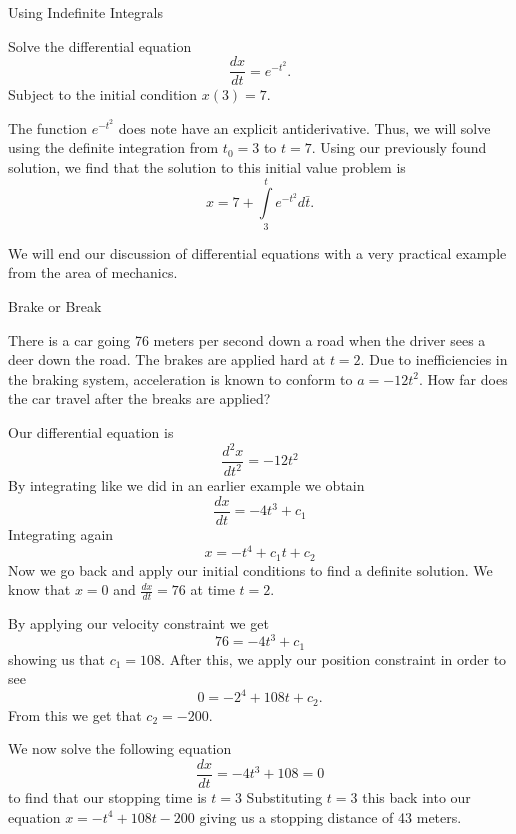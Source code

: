 \begin{example} Using Indefinite Integrals\newline

Solve the differential equation 
$$\frac{dx}{dt} = e^{-t^2}.$$
Subject to the initial condition $x(3)=7.$\newline

The function $e^{-t^2}$ does note have an explicit antiderivative. Thus, we will solve using the definite integration from $t_0=3$ to $t=7.$ Using our previously found solution, we find that the solution to this initial value problem is $$x=7+\int\limits_3^t e^{-t^2}d\bar{t}.$$
\end{example}

We will end our discussion of differential equations with a very practical example from the area of mechanics.

\begin{example} Brake or Break\newline

There is a car going 76 meters per second down a road when the driver sees a deer down the road. The brakes are applied hard at $t=2.$ Due to inefficiencies in the braking system, acceleration is known to conform to $a=-12t^2$. How far does the car travel after the breaks are applied?\newline

Our differential equation is $$\frac{d^2x}{dt^2}=-12t^2$$
By integrating like we did in an earlier example we obtain
$$\frac{dx}{dt}=-4t^3 + c_1$$
Integrating again
$$x=-t^4 + c_1 t + c_2$$
Now we go back and apply our initial conditions to find a definite solution. We know that $x=0$ and $\frac{dx}{dt}=76$ at time $t=2.$\newline

By applying our velocity constraint we get $$76 = -4t^3 +c_1$$
showing us that $c_1 = 108.$ After this, we apply our position constraint in order to see $$0=-2^4 + 108t+c_2.$$ From this we get that $c_2 = -200.$\newline

We now solve the following equation $$\frac{dx}{dt} =-4t^3 +108 = 0$$ to find that our stopping time is $t=3$ Substituting $t=3$ this back into our equation $x=-t^4 + 108t -200$ giving us a stopping distance of 43 meters.
\end{example}


